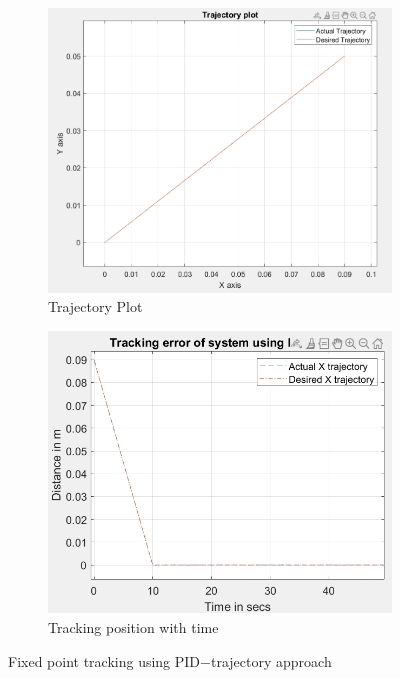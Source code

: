\documentclass[conference]{IEEEtran}
\begin{document}
\begin{figure}[h]
     \centering
     \begin{subfigure}[b]{0.24\textwidth}
         \centering
         \includegraphics[width=\textwidth, height=\textwidth]{FPTPID.png}
         \caption{Trajectory Plot}
         \label{FP PID trajectory plot}
     \end{subfigure}
     \begin{subfigure}[b]{0.24\textwidth}
         \centering
         \includegraphics[width=\textwidth,height=\textwidth]{FPTEPID.png}
         \caption{Tracking position with time}
         \label{FP PID position with time}
     \end{subfigure}
        \caption{Fixed point tracking using PID$-$trajectory approach}
        \label{fig5 PID}
\end{figure}
\end{document}

